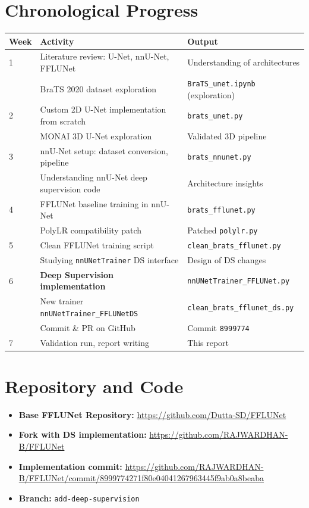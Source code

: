 \documentclass[12pt,a4paper]{report}
\begin{document}
\section{Chronological Progress}

\begin{table}[H]
\centering
\caption{Summary of work done during the internship}
\label{tab:timeline}
\begin{longtable}{lll}
\toprule
\textbf{Week} & \textbf{Activity} & \textbf{Output} \\
\midrule
1 & Literature review: U-Net, nnU-Net, FFLUNet & Understanding of architectures \\
  & BraTS 2020 dataset exploration & \texttt{BraTS\_unet.ipynb} (exploration) \\
\midrule
2 & Custom 2D U-Net implementation from scratch & \texttt{brats\_unet.py} \\
  & MONAI 3D U-Net exploration & Validated 3D pipeline \\
\midrule
3 & nnU-Net setup: dataset conversion, pipeline & \texttt{brats\_nnunet.py} \\
  & Understanding nnU-Net deep supervision code & Architecture insights \\
\midrule
4 & FFLUNet baseline training in nnU-Net & \texttt{brats\_fflunet.py} \\
  & PolyLR compatibility patch & Patched \texttt{polylr.py} \\
\midrule
5 & Clean FFLUNet training script & \texttt{clean\_brats\_fflunet.py} \\
  & Studying \texttt{nnUNetTrainer} DS interface & Design of DS changes \\
\midrule
6 & \textbf{Deep Supervision implementation} & \texttt{nnUNetTrainer\_FFLUNet.py} \\
  & New trainer \texttt{nnUNetTrainer\_FFLUNetDS} & \texttt{clean\_brats\_fflunet\_ds.py} \\
  & Commit \& PR on GitHub & Commit \texttt{8999774} \\
\midrule
7 & Validation run, report writing & This report \\
\bottomrule
\end{longtable}
\end{table}

\section{Repository and Code}

\begin{itemize}[leftmargin=*]
    \item \textbf{Base FFLUNet Repository:} \url{https://github.com/Dutta-SD/FFLUNet}
    \item \textbf{Fork with DS implementation:} \url{https://github.com/RAJWARDHAN-B/FFLUNet}
    \item \textbf{Implementation commit:} \url{https://github.com/RAJWARDHAN-B/FFLUNet/commit/8999774271f80e04041267963445f9ab0a8beaba}
    \item \textbf{Branch:} \texttt{add-deep-supervision}
\end{itemize}
\end{document}

